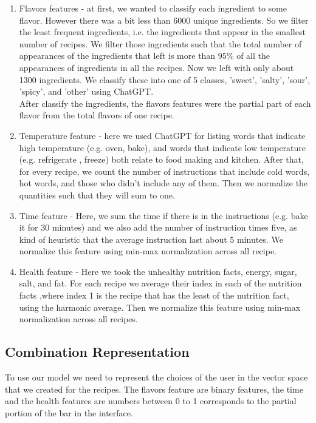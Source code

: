 \documentclass[]{article}
\begin{document}
\begin{enumerate}
	\item Flavors features - at first, we wanted to classify each ingredient to some flavor. However there was a bit less than 6000 unique ingredients. So we filter the least frequent ingredients, i.e. the ingredients that appear in the smallest number of recipes. We filter those ingredients such that the total number of appearances of the ingredients that left is more than 95\% of all the appearances of ingredients in all the recipes. Now we left with only about 1300 ingredients. We classify these into one of 5 classes, 'sweet', 'salty', 'sour', 'spicy', and 'other' using ChatGPT.\\
	After classify the ingredients, the flavors features were the partial part of each flavor from the total flavors of one recipe.

	\item Temperature feature - here we used ChatGPT for listing words that indicate high temperature (e.g. oven, bake), and words that indicate low temperature (e.g. refrigerate , freeze) both relate to food making and kitchen. After that, for every recipe, we count the number of instructions that include cold words, hot words, and those who didn't include any of them. Then we normalize the quantities such that they will sum to one.

	\item Time feature - Here, we sum the time if there is in the instructions (e.g. bake it for 30 minutes) and we also add the number of instruction times five, as kind of heuristic that the average instruction last about 5 minutes. We normalize this feature using min-max normalization across all recipe. 

	\item Health feature - Here we took the unhealthy nutrition facts, energy, sugar, salt, and fat. For each recipe we average their index in each of the nutrition facts ,where index 1 is the recipe that has the least of the nutrition fact, using the harmonic average. Then we normalize this feature using min-max normalization across all recipes. 
\end{enumerate}

\subsection{Combination Representation}
To use our model we need to represent the choices of the user in the vector space that we created for the recipes. The flavors feature are binary features, the time and the health features are numbers between 0 to 1 corresponds to the partial portion of the bar in the interface.
\end{document}
